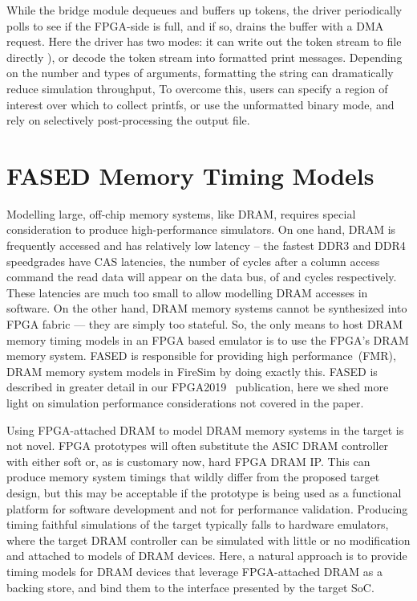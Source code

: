 While the bridge module dequeues and buffers up tokens, the driver periodically
polls to see if the FPGA-side is full, and if so, drains the buffer with a
 DMA request. Here the driver has two modes: it can write out the
token stream to file directly ), or decode the token stream into
formatted print messages. Depending on the number and types of arguments,
formatting the string can dramatically reduce simulation throughput, To
overcome this, users can specify a region of interest over which to collect
printfs, or use the unformatted binary mode, and rely on selectively
post-processing the output file.

\section{FASED Memory Timing Models}

Modelling large, off-chip memory systems, like DRAM, requires special
consideration to produce high-performance simulators. On one hand, DRAM is
frequently accessed and has relatively low latency -- the fastest DDR3 and DDR4
speedgrades have CAS latencies, the number of cycles after a
column access command the read data will appear on the data bus, of 
and  cycles respectively.  These latencies are much too small to allow
modelling DRAM accesses in software. On the other hand, DRAM memory systems
cannot be synthesized into FPGA fabric --- they are simply too stateful. So,
the only means to host DRAM memory timing models in an FPGA based emulator is
to use the FPGA's DRAM memory system. FASED is responsible for providing
high performance~(FMR), DRAM memory system models in FireSim by doing exactly this.
FASED is described in greater detail in our FPGA2019~\cite{FASED} publication, here
we shed more light on simulation performance considerations not covered in the paper.

Using FPGA-attached DRAM to model DRAM memory systems in the target is not
novel. FPGA prototypes will often substitute the ASIC DRAM controller with
either soft or, as is customary now, hard FPGA DRAM IP. This can produce memory
system timings that wildly differ from the proposed target design, but this may
be acceptable if the prototype is being used as a functional platform for
software development and not for performance validation. Producing timing faithful
simulations of the target typically falls to hardware emulators, where the
target DRAM controller can be simulated with little or no modification and attached to models of DRAM
devices. Here, a natural approach is to provide timing models for DRAM devices that leverage FPGA-attached DRAM
as a backing store, and bind them to the interface presented by the target SoC.


